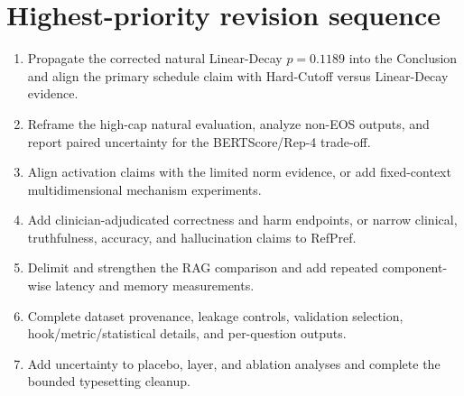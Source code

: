 \documentclass[11pt]{article}
\begin{document}
\section*{Highest-priority revision sequence}

\begin{enumerate}
    \item Propagate the corrected natural Linear-Decay $p=0.1189$ into the Conclusion and align the primary schedule claim with Hard-Cutoff versus Linear-Decay evidence.
    \item Reframe the high-cap natural evaluation, analyze non-EOS outputs, and report paired uncertainty for the BERTScore/Rep-4 trade-off.
    \item Align activation claims with the limited norm evidence, or add fixed-context multidimensional mechanism experiments.
    \item Add clinician-adjudicated correctness and harm endpoints, or narrow clinical, truthfulness, accuracy, and hallucination claims to RefPref.
    \item Delimit and strengthen the RAG comparison and add repeated component-wise latency and memory measurements.
    \item Complete dataset provenance, leakage controls, validation selection, hook/metric/statistical details, and per-question outputs.
    \item Add uncertainty to placebo, layer, and ablation analyses and complete the bounded typesetting cleanup.
\end{enumerate}
\end{document}

